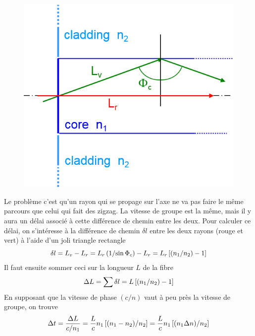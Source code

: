 \begin{figure}
	\vspace{-5mm}
	\includegraphics[scale=0.34]{ch1/image5}
	\end{figure}
Le problème c'est qu'un rayon qui se propage sur l'axe ne va pas faire le même parcours que 
celui qui fait des zigzag. La vitesse de groupe est la même, mais il y aura un délai associé 
à cette différence de chemin entre les deux. Pour calculer ce délai, on s'intéresse à la différence
de chemin $\delta l$ entre les deux rayons (rouge et vert) à l'aide d'un joli triangle rectangle
\begin{equation}
\delta l = {L_v} - {L_r} = {L_r}\left( {{1 \mathord{\left/
 {\vphantom {1 {\sin {\Phi _c}}}} \right.
 \kern-\nulldelimiterspace} {\sin {\Phi _c}}}} \right) - {L_r} = {L_r}\left[ {\left( {{{{n_1}} \mathord{\left/
 {\vphantom {{{n_1}} {{n_2}}}} \right.
 \kern-\nulldelimiterspace} {{n_2}}}} \right) - 1} \right]
\end{equation}
Il faut ensuite sommer ceci sur la longueur $L$ de la fibre 
\begin{equation}
\Delta L = \sum {\delta l}  = L\left[ {\left( {{{{n_1}} \mathord{\left/
{\vphantom {{{n_1}} {{n_2}}}} \right.
\kern-\nulldelimiterspace} {{n_2}}}} \right) - 1} \right]
\end{equation}
En supposant que la vitesse de phase $(c/n)$ vaut à peu près la vitesse de groupe, on trouve
\begin{equation}
\Delta t = \frac{{\Delta L}}{{{c \mathord{\left/
 {\vphantom {c {{n_1}}}} \right.
 \kern-\nulldelimiterspace} {{n_1}}}}} = \frac{L}{c}{n_1}\left[ {{{\left( {{n_1} - {n_2}} \right)} \mathord{\left/
 {\vphantom {{\left( {{n_1} - {n_2}} \right)} {{n_2}}}} \right.
 \kern-\nulldelimiterspace} {{n_2}}}} \right] = \frac{L}{c}{n_1}\left[ {{{\left( {{n_1}\Delta n} \right)} \mathord{\left/
 {\vphantom {{\left( {{n_1}\Delta n} \right)} {{n_2}}}} \right.
 \kern-\nulldelimiterspace} {{n_2}}}} \right]
\end{equation}
